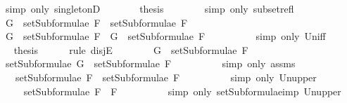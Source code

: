 \begin{isabellebody}
\ {\isacharparenleft}simp\ only{\isacharcolon}\ singletonD{\isacharparenright}\isanewline
\ \ \ \ \isamarkupfalse%
\ \isamarkupfalse%
\ {\isacharquery}thesis\isanewline
\ \ \ \ \ \ \isamarkupfalse%
\ {\isacharparenleft}simp\ only{\isacharcolon}\ subset{\isacharunderscore}refl{\isacharparenright}\isanewline
\ \ \isamarkupfalse%
\isanewline
\ \ \ \ \isamarkupfalse%
\ {\isachardoublequoteopen}G\ {\isasymin}\ setSubformulae\ F{}\ {\isasymunion}\ setSubformulae\ F{}{\isachardoublequoteclose}\isanewline
\ \ \ \ \isamarkupfalse%
\ \isamarkupfalse%
\ {\isachardoublequoteopen}G\ {\isasymin}\ setSubformulae\ F{}\ {\isasymor}\ G\ {\isasymin}\ setSubformulae\ F{}{\isachardoublequoteclose}\ \ \isanewline
\ \ \ \ \ \ \isamarkupfalse%
\ {\isacharparenleft}simp\ only{\isacharcolon}\ Un{\isacharunderscore}iff{\isacharparenright}\isanewline
\ \ \ \ \isamarkupfalse%
\ \isamarkupfalse%
\ {\isacharquery}thesis\isanewline
\ \ \ \ \isamarkupfalse%
\ {\isacharparenleft}rule\ disjE{\isacharparenright}\isanewline
\ \ \ \ \ \ \isamarkupfalse%
\ {\isachardoublequoteopen}G\ {\isasymin}\ setSubformulae\ F{}{\isachardoublequoteclose}\isanewline
\ \ \ \ \ \ \isamarkupfalse%
\ \isamarkupfalse%
\ {\isachardoublequoteopen}setSubformulae\ G\ {\isasymsubseteq}\ setSubformulae\ F{}{\isachardoublequoteclose}\isanewline
\ \ \ \ \ \ \ \ \isamarkupfalse%
\ {\isacharparenleft}simp\ only{\isacharcolon}\ assms{\isacharparenleft}{}{\isacharparenright}{\isacharparenright}\isanewline
\ \ \ \ \ \ \isamarkupfalse%
\ \isamarkupfalse%
\ {\isachardoublequoteopen}{\isasymdots}\ {\isasymsubseteq}\ setSubformulae\ F{}\ {\isasymunion}\ setSubformulae\ F{}{\isachardoublequoteclose}\isanewline
\ \ \ \ \ \ \ \ \isamarkupfalse%
\ {\isacharparenleft}simp\ only{\isacharcolon}\ Un{\isacharunderscore}upper{}{\isacharparenright}\isanewline
\ \ \ \ \ \ \isamarkupfalse%
\ \isamarkupfalse%
\ {\isachardoublequoteopen}{\isasymdots}\ {\isasymsubseteq}\ setSubformulae\ {\isacharparenleft}F{}\ \isactrlbold {\isasymrightarrow}\ F{}{\isacharparenright}{\isachardoublequoteclose}\isanewline
\ \ \ \ \ \ \ \ \isamarkupfalse%
\ {\isacharparenleft}simp\ only{\isacharcolon}\ setSubformulae{\isacharunderscore}imp\ Un{\isacharunderscore}upper{}{\isacharparenright}\isanewline

\end{isabellebody}
